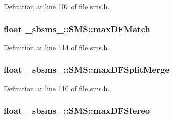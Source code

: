 Definition at line 107 of file sms.\+h.

\subsubsection[{\texorpdfstring{max\+D\+F\+Match}{maxDFMatch}}]{\setlength{\rightskip}{0pt plus 5cm}float \+\_\+sbsms\+\_\+\+::\+S\+M\+S\+::max\+D\+F\+Match\hspace{0.3cm}{\ttfamily [protected]}}\hypertarget{class__sbsms___1_1_s_m_s_ad725d2bc2b7e676030cd0f7d303e0643}{}\label{class__sbsms___1_1_s_m_s_ad725d2bc2b7e676030cd0f7d303e0643}


Definition at line 114 of file sms.\+h.

\subsubsection[{\texorpdfstring{max\+D\+F\+Split\+Merge}{maxDFSplitMerge}}]{\setlength{\rightskip}{0pt plus 5cm}float \+\_\+sbsms\+\_\+\+::\+S\+M\+S\+::max\+D\+F\+Split\+Merge\hspace{0.3cm}{\ttfamily [protected]}}\hypertarget{class__sbsms___1_1_s_m_s_a54d21724cb856d088fdcb7caf0c2ef55}{}\label{class__sbsms___1_1_s_m_s_a54d21724cb856d088fdcb7caf0c2ef55}


Definition at line 110 of file sms.\+h.

\subsubsection[{\texorpdfstring{max\+D\+F\+Stereo}{maxDFStereo}}]{\setlength{\rightskip}{0pt plus 5cm}float \+\_\+sbsms\+\_\+\+::\+S\+M\+S\+::max\+D\+F\+Stereo\hspace{0.3cm}{\ttfamily [protected]}}\hypertarget{class__sbsms___1_1_s_m_s_a9c1deda84ae4500c846dc6887f0da817}{}\label{class__sbsms___1_1_s_m_s_a9c1deda84ae4500c846dc6887f0da817}


